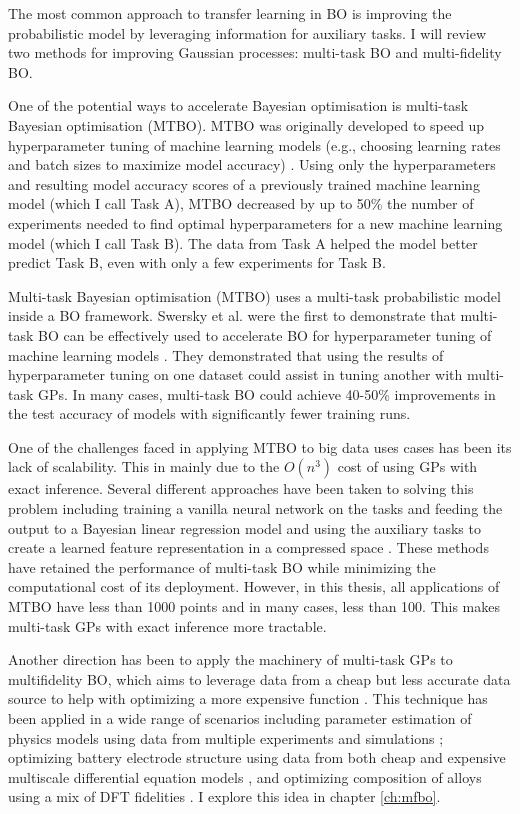 The most common approach to transfer learning in BO is improving the probabilistic model by leveraging information for auxiliary tasks. I will review two methods for improving  Gaussian processes: multi-task BO and multi-fidelity BO.

One of the potential ways to accelerate Bayesian optimisation is multi-task Bayesian optimisation (MTBO). MTBO was originally developed to speed up hyperparameter tuning of machine learning models (e.g., choosing learning rates and batch sizes to maximize model accuracy) \cite{Swersky2013}. Using only the hyperparameters and resulting model accuracy scores of a previously trained machine learning model (which I call Task A),  MTBO decreased by up to 50\% the number of experiments needed to find optimal hyperparameters for a new machine learning model (which I call Task B).  The data from Task A helped the model better predict Task B, even with only a few experiments for Task B.

Multi-task Bayesian optimisation (MTBO) uses a multi-task probabilistic model inside a BO framework.  Swersky et al. were the first to demonstrate that multi-task BO can be effectively used to accelerate BO for hyperparameter tuning of machine learning models \cite{Swersky2013}. They demonstrated that using the results of hyperparameter tuning on one dataset could assist in tuning another with multi-task GPs. In many cases, multi-task BO could achieve 40-50\% improvements in the test accuracy of models with significantly fewer training runs.  

One of the challenges faced in applying MTBO to big data uses cases has been its lack of scalability. This in mainly due to the $O(n^3)$ cost of using GPs with exact inference. Several different approaches have been taken to solving this problem including training a vanilla neural network on the tasks and feeding the output to a Bayesian linear regression model \cite{Perrone2018} and using the auxiliary tasks to create a learned feature representation in a compressed space \cite{Hakhamaneshi2021}. These methods have retained the performance of multi-task BO while minimizing the computational cost of its deployment. However, in this thesis, all applications of MTBO have less than 1000 points and in many cases, less than 100. This makes multi-task GPs with exact inference more tractable.

Another direction has been to apply the machinery of multi-task GPs to multifidelity BO, which aims to leverage data from a cheap but less accurate data source to help with optimizing a more expensive function \cite{Huang2006, Forrester2007}. This technique has been applied in a wide range of scenarios including parameter estimation of physics models using data from multiple experiments and simulations \cite{Perdikaris2016}; optimizing battery electrode structure using data from both cheap and expensive multiscale differential equation models \cite{Pan2017, Folch2023}, and optimizing composition of alloys using a mix of DFT fidelities \cite{Tran2020}. I explore this idea in chapter \ref{ch:mfbo}.

